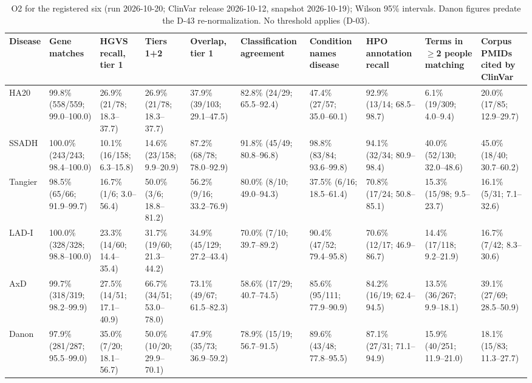 \documentclass{article} %
\begin{document}
\begin{table}
\caption{O2 for the registered six (run 2026-10-20; ClinVar release 2026-10-12, snapshot 2026-10-19); Wilson 95\% intervals. Danon figures predate the D-43 re-normalization. No threshold applies (D-03).}
\begin{center}
\scriptsize
\begin{tabularx}{\linewidth}{lYYYYYYYYY}
\toprule
Disease & Gene matches & HGVS recall, tier 1 & Tiers 1+2 & Overlap, tier 1 & Classification agreement & Condition names disease & HPO annotation recall & Terms in $\geq$2 people matching & Corpus PMIDs cited by ClinVar \\
\midrule
HA20 & 99.8\% (558/559; 99.0--100.0) & 26.9\% (21/78; 18.3--37.7) & 26.9\% (21/78; 18.3--37.7) & 37.9\% (39/103; 29.1--47.5) & 82.8\% (24/29; 65.5--92.4) & 47.4\% (27/57; 35.0--60.1) & 92.9\% (13/14; 68.5--98.7) & 6.1\% (19/309; 4.0--9.4) & 20.0\% (17/85; 12.9--29.7) \\
SSADH & 100.0\% (243/243; 98.4--100.0) & 10.1\% (16/158; 6.3--15.8) & 14.6\% (23/158; 9.9--20.9) & 87.2\% (68/78; 78.0--92.9) & 91.8\% (45/49; 80.8--96.8) & 98.8\% (83/84; 93.6--99.8) & 94.1\% (32/34; 80.9--98.4) & 40.0\% (52/130; 32.0--48.6) & 45.0\% (18/40; 30.7--60.2) \\
Tangier & 98.5\% (65/66; 91.9--99.7) & 16.7\% (1/6; 3.0--56.4) & 50.0\% (3/6; 18.8--81.2) & 56.2\% (9/16; 33.2--76.9) & 80.0\% (8/10; 49.0--94.3) & 37.5\% (6/16; 18.5--61.4) & 70.8\% (17/24; 50.8--85.1) & 15.3\% (15/98; 9.5--23.7) & 16.1\% (5/31; 7.1--32.6) \\
LAD-I & 100.0\% (328/328; 98.8--100.0) & 23.3\% (14/60; 14.4--35.4) & 31.7\% (19/60; 21.3--44.2) & 34.9\% (45/129; 27.2--43.4) & 70.0\% (7/10; 39.7--89.2) & 90.4\% (47/52; 79.4--95.8) & 70.6\% (12/17; 46.9--86.7) & 14.4\% (17/118; 9.2--21.9) & 16.7\% (7/42; 8.3--30.6) \\
AxD & 99.7\% (318/319; 98.2--99.9) & 27.5\% (14/51; 17.1--40.9) & 66.7\% (34/51; 53.0--78.0) & 73.1\% (49/67; 61.5--82.3) & 58.6\% (17/29; 40.7--74.5) & 85.6\% (95/111; 77.9--90.9) & 84.2\% (16/19; 62.4--94.5) & 13.5\% (36/267; 9.9--18.1) & 39.1\% (27/69; 28.5--50.9) \\
Danon & 97.9\% (281/287; 95.5--99.0) & 35.0\% (7/20; 18.1--56.7) & 50.0\% (10/20; 29.9--70.1) & 47.9\% (35/73; 36.9--59.2) & 78.9\% (15/19; 56.7--91.5) & 89.6\% (43/48; 77.8--95.5) & 87.1\% (27/31; 71.1--94.9) & 15.9\% (40/251; 11.9--21.0) & 18.1\% (15/83; 11.3--27.7) \\
\bottomrule
\end{tabularx}

\end{center}
\end{table}
\end{document}

